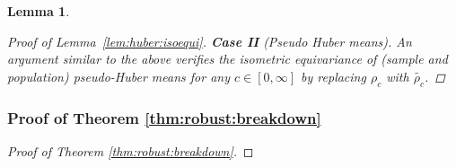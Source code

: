 \documentclass[preprint]{imsart}
\theoremstyle{plain}
\newtheorem{lemma}{Lemma}
\theoremstyle{remark}
\begin{document}
\begin{appendix}
\begin{lemma}
\begin{proof}[Proof of Lemma~\ref{lem:huber:isoequi}]
\textbf{Case II} (Pseudo Huber means). An argument similar to the above verifies the isometric equivariance of (sample and population) pseudo-Huber means for any $c \in [0, \infty]$ by replacing $\rho_{c}$ with $\tilde{\rho_{c}}$.
\end{proof}
\end{lemma}





\subsubsection{Proof of Theorem \ref{thm:robust:breakdown}}





\begin{proof}[Proof of Theorem \ref{thm:robust:breakdown}]


\end{proof}
\end{appendix}
\end{document}
